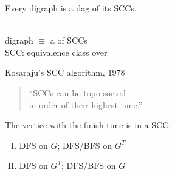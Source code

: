 
\begin{frame}{}
  \begin{theorem}
    Every digraph is a dag of its SCCs.
  \end{theorem}

  \pause
  \vspace{0.60cm}
  \begin{center}
     \\[10pt] 

    digraph $\equiv$ a  of SCCs \\[6pt]

    SCC: equivalence class over 
  \end{center}
\end{frame}

\begin{frame}{}
  \centerline{}

  \vspace{0.50cm}
  \begin{exampleblock}{Kosaraju's SCC algorithm, $1978$}
    \begin{quote}
      \begin{center}
	{\large ``SCCs can be topo-sorted \\[3pt] in  order of their highest  time.''}
      \end{center}
    \end{quote}

    \pause
    \centerline{The vertice with the  finish time is in a  SCC.}
  \end{exampleblock}

  \pause
  \vspace{0.60cm}
  \begin{enumerate}[(I)]
    \centering
  \item DFS on $G$; \; DFS/BFS on $G^{T}$ \\[8pt]
      \pause
    \item DFS on $G^{T}$;\; DFS/BFS on $G$
  \end{enumerate}
\end{frame}

